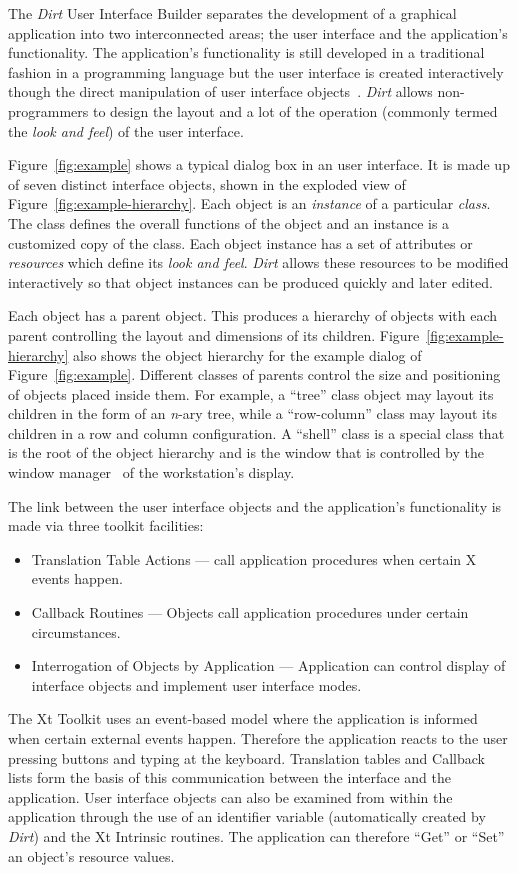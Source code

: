 The {\em Dirt} User Interface Builder separates the development of a
graphical application into two interconnected areas; the user interface and
the application's functionality.  The application's functionality is still
developed in a traditional fashion in a programming language but the user
interface is created interactively though the direct manipulation of user
interface objects~\cite{direct-manipulation}.  {\em Dirt} allows
non-programmers to design the layout and a lot of the operation (commonly
termed the {\em look and feel}) of the user interface.

Figure~\ref{fig:example} shows a typical dialog box in an user interface.  
It is made up of seven distinct interface objects, shown in the exploded view of
Figure~\ref{fig:example-hierarchy}.  Each object is an {\em instance} of a
particular
{\em class}.  The class defines the overall functions of the object and an
instance is a customized copy of the class.  Each object instance has a set of
attributes or {\em resources} which define its {\em look and feel}. 
{\em Dirt} allows these resources to be modified interactively so that
object instances can be produced quickly and later edited.

Each object has a parent object.  This produces a hierarchy
of objects with each parent controlling the layout and dimensions of its
children.  Figure~\ref{fig:example-hierarchy} also shows the object
hierarchy for the
example dialog of Figure~\ref{fig:example}.  Different classes of parents
control the size and positioning of objects placed inside them.  For example,
a ``tree'' class object may layout its children in the form of an {\em n}-ary
tree, while a ``row-column'' class may layout its children in a row and column
configuration.  A ``shell'' class is a special class that is the root of the
object hierarchy and is the window that is controlled by the window
manager~\cite{XUsersGuideOReilly} of the workstation's display.

The link between the user interface objects and the application's
functionality is made via three toolkit facilities:\begin{itemize}
\item{}
Translation Table Actions --- call application procedures when certain X
events happen.
\item{}
Callback Routines --- Objects call application procedures under certain
circumstances.
\item{}
Interrogation of Objects by Application --- Application can control display
of interface objects and implement user interface modes.
\end{itemize}
The Xt Toolkit uses an event-based model where the application is informed
when certain external events happen.  Therefore the application reacts to the
user pressing buttons and typing at the keyboard.  Translation tables and
Callback lists form the basis of this communication between the interface and
the application.  User interface objects can also be examined from within the
application through the use of an identifier variable (automatically created
by {\em Dirt}) and the Xt Intrinsic routines.  The application can therefore
``Get'' or ``Set'' an object's resource values.

